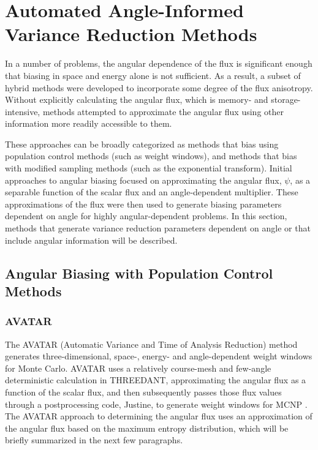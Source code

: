 \section{Automated Angle-Informed Variance Reduction Methods}
\label{sec:AngleVR}

In a number of problems, the angular dependence of the flux is significant enough that
biasing in space and energy alone is not
sufficient. As a result, a subset of hybrid methods were developed to incorporate some
degree of the flux anisotropy. Without explicitly
calculating the angular flux, which is memory- and storage-intensive, methods
attempted to approximate the angular flux using other information more readily
accessible to them. 

These approaches can be broadly categorized as methods that
bias using population control methods (such as weight windows),
and methods that bias with modified
sampling methods (such as the exponential transform).
Initial approaches
to angular biasing focused on approximating the angular flux, $\psi$,
as a separable
function of the scalar flux and an angle-dependent multiplier.
These approximations of the flux were then used to generate biasing
parameters dependent on angle for highly angular-dependent problems. In this
section, methods that generate variance reduction parameters dependent on angle
or that include angular information will be described.

\subsection{Angular Biasing with Population Control Methods}

\subsubsection{AVATAR}
\label{subsec:AVATAR}

The AVATAR \cite{van_riper_generation_1995, van_riper_avatarautomatic_1997}
(Automatic Variance and Time of Analysis Reduction) method generates
three-dimensional, space-, energy- and angle-dependent weight windows for Monte
Carlo.
AVATAR uses a relatively course-mesh and few-angle deterministic calculation in
THREEDANT, approximating the angular flux as a function of the scalar flux, and
then subsequently passes those flux values through a postprocessing
code, Justine, to generate
weight windows for MCNP \cite{mcnp_manual_v1}. The AVATAR approach to
determining the angular flux uses an approximation of the angular flux based on
the maximum entropy distribution, which will be briefly summarized in the next
few paragraphs.

